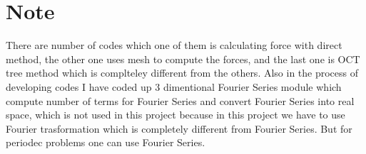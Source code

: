 \documentclass[10pt]{article}
\begin{document}
\section{Note}
There are number of codes which one of them is calculating force with direct method, the other one uses mesh to compute the forces, and the last one is OCT tree method which is complteley different from the others. Also in the process of developing codes I have coded up 3 dimentional Fourier Series module which compute number of terms for Fourier Series and convert Fourier Series into real space, which is not used in this project because in this project we have to use Fourier trasformation which is completely different from Fourier Series. But for periodec problems one can use Fourier Series.

\pagebreak
\end{document}
